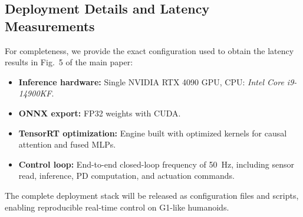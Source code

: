 \subsection{Deployment Details and Latency Measurements}
\label{subsec:deployment_details}

For completeness, we provide the exact configuration used to obtain the latency results in Fig.~5 of the main paper:
\begin{itemize}[leftmargin=1.5em]
    \item \textbf{Inference hardware:} Single NVIDIA RTX 4090 GPU, CPU: \emph{Intel Core i9-14900KF}.
    \item \textbf{ONNX export:} FP32 weights with CUDA.
    \item \textbf{TensorRT optimization:} Engine built with optimized kernels for causal attention and fused MLPs.
    \item \textbf{Control loop:} End-to-end closed-loop frequency of 50~Hz, including sensor read, inference, PD computation, and actuation commands.
\end{itemize}

The complete deployment stack will be released as configuration files and scripts, enabling reproducible real-time control on G1-like humanoids.